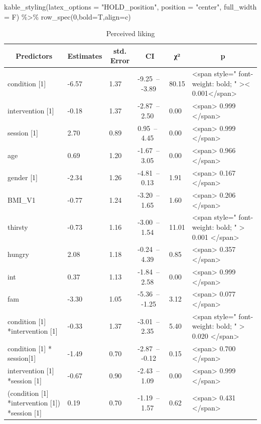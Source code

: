 \documentclass[
]{article}
\newenvironment{Shaded}{\begin{snugshade}}{\end{snugshade}}
\newcommand{\AttributeTok}[1]{\textcolor[rgb]{0.77,0.63,0.00}{#1}}
\newcommand{\DecValTok}[1]{\textcolor[rgb]{0.00,0.00,0.81}{#1}}
\newcommand{\FunctionTok}[1]{\textcolor[rgb]{0.00,0.00,0.00}{#1}}
\newcommand{\NormalTok}[1]{#1}
\newcommand{\SpecialCharTok}[1]{\textcolor[rgb]{0.00,0.00,0.00}{#1}}
\newcommand{\StringTok}[1]{\textcolor[rgb]{0.31,0.60,0.02}{#1}}
\begin{document}
\begin{Shaded}
\begin{Highlighting}[]
  \FunctionTok{kable\_styling}\NormalTok{(}\AttributeTok{latex\_options =} \StringTok{"HOLD\_position"}\NormalTok{, }\AttributeTok{position =} \StringTok{"center"}\NormalTok{, }\AttributeTok{full\_width =}\NormalTok{ F) }\SpecialCharTok{\%\textgreater{}\%}  \FunctionTok{row\_spec}\NormalTok{(}\DecValTok{0}\NormalTok{,}\AttributeTok{bold=}\NormalTok{T,}\AttributeTok{align=}\StringTok{\textquotesingle{}c\textquotesingle{}}\NormalTok{)}
\end{Highlighting}
\end{Shaded}

\begin{table}[H]

\caption{\label{tab:HED_mod}Perceived liking}
\centering
\begin{tabular}[t]{l|l|l|l|l|l}
\hline
\multicolumn{1}{c}{\textbf{Predictors}} & \multicolumn{1}{c}{\textbf{Estimates}} & \multicolumn{1}{c}{\textbf{std. Error}} & \multicolumn{1}{c}{\textbf{CI}} & \multicolumn{1}{c}{\textbf{χ²}} & \multicolumn{1}{c}{\textbf{p}}\\
\hline
condition [1] & -6.57 & 1.37 & -9.25 – -3.89 & 80.15 & <span style=" font-weight: bold;    " >< 0.001</span>\\
\hline
intervention [1] & -0.18 & 1.37 & -2.87 – 2.50 & 0.00 & <span> 0.999 </span>\\
\hline
session [1] & 2.70 & 0.89 & 0.95 – 4.45 & 0.00 & <span> 0.999 </span>\\
\hline
age & 0.69 & 1.20 & -1.67 – 3.05 & 0.00 & <span> 0.966 </span>\\
\hline
gender [1] & -2.34 & 1.26 & -4.81 – 0.13 & 1.91 & <span> 0.167 </span>\\
\hline
BMI_V1 & -0.77 & 1.24 & -3.20 – 1.65 & 1.60 & <span> 0.206 </span>\\
\hline
thirsty & -0.73 & 1.16 & -3.00 – 1.54 & 11.01 & <span style=" font-weight: bold; " > 0.001 </span>\\
\hline
hungry & 2.08 & 1.18 & -0.24 – 4.39 & 0.85 & <span> 0.357 </span>\\
\hline
int & 0.37 & 1.13 & -1.84 – 2.58 & 0.00 & <span> 0.999 </span>\\
\hline
fam & -3.30 & 1.05 & -5.36 – -1.25 & 3.12 & <span> 0.077 </span>\\
\hline
condition [1] *intervention [1] & -0.33 & 1.37 & -3.01 – 2.35 & 5.40 & <span style=" font-weight: bold; " > 0.020 </span>\\
\hline
condition [1] * session[1] & -1.49 & 0.70 & -2.87 – -0.12 & 0.15 & <span> 0.700 </span>\\
\hline
intervention [1] *session [1] & -0.67 & 0.90 & -2.43 – 1.09 & 0.00 & <span> 0.999 </span>\\
\hline
(condition [1] *intervention [1]) *session [1] & 0.19 & 0.70 & -1.19 – 1.57 & 0.62 & <span> 0.431 </span>\\
\hline
\end{tabular}
\end{table}
\end{document}

